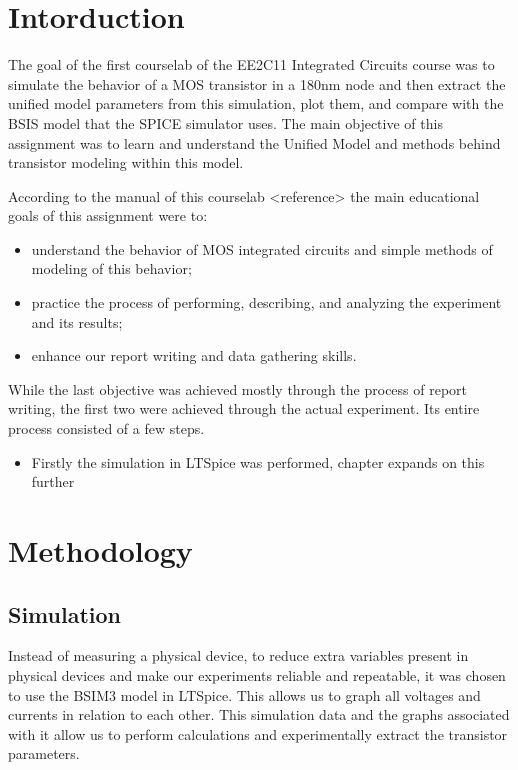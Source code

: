 \chapter{Intorduction}

The goal of the first courselab of the EE2C11 Integrated Circuits course was to simulate the behavior of a MOS transistor in a 180nm node and then extract the unified model parameters from this simulation, plot them, and compare with the BSIS model that the SPICE simulator uses. The main objective of this assignment was to learn and understand the Unified Model and methods behind transistor modeling within this model.

According to the manual of this courselab <reference> the main educational goals of this assignment were to:
\begin{itemize}
        \item understand the behavior of MOS integrated circuits and simple methods of modeling of this behavior;
        \item practice the process of performing, describing, and analyzing the experiment and its results;
        \item enhance our report writing and data gathering skills.
\end{itemize}

While the last objective was achieved mostly through the process of report writing, the first two were achieved through the actual experiment. Its entire process consisted of a few steps.

\begin{itemize}
        \item Firstly the simulation in LTSpice was performed, chapter  expands on this further

\end{itemize}

\chapter{Methodology}

\section{Simulation}
Instead of measuring a physical device, to reduce extra variables present in physical devices and make our experiments reliable and repeatable, it was chosen to use the BSIM3 model in LTSpice. This allows us to graph all voltages and currents in relation to each other. This simulation data and the graphs associated with it allow us to perform calculations and experimentally extract the transistor parameters.\\


